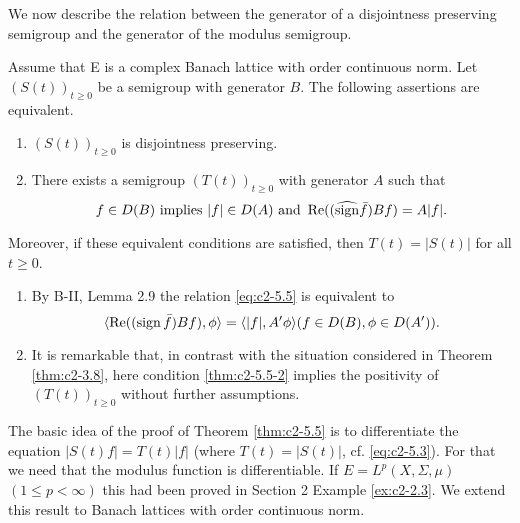 We now describe the relation between the generator of a disjointness preserving semigroup and the generator of the modulus semigroup.

\begin{theorem}\label{thm:c2-5.5}
Assume that E is a complex Banach lattice with order continuous norm. 
Let $(S(t))_{t \geq 0}$ be a semigroup with generator $B$.
The following assertions are equivalent.
\begin{enumerate}[\upshape (a)]
\item \label{thm:c2-5.5-1}
$(S(t))_{t \geq 0}$ is disjointness preserving.
\item \label{thm:c2-5.5-2}
There exists a semigroup $(T(t))_{t \geq 0}$ with generator $A$ such
that
\begin{equation}\label{eq:c2-5.5}
f \in D(B) \text{ implies } |f| \in D(A) \text{ and } \mathop{}\!\mathrm{Re}((\widehat{\operatorname{sign}}  \bar{f})Bf) = A|f|.
\end{equation}
\end{enumerate}
Moreover, if these equivalent conditions are satisfied, then
$T(t) = |S(t)|$ for all $t \geq 0$.
\end{theorem}

\begin{remark*} 
\begin{enumerate}[\upshape (i), wide, labelindent=.5em] %
\item  \label{enum:c2-kgk.1-1} %
By B-II, Lemma 2.9 
the relation \eqref{eq:c2-5.5} is equivalent to
\[
\langle\mathop{}\!\mathrm{Re}((\operatorname{sign}  \bar{f})Bf),\phi \rangle = \langle|f|,A'\phi\rangle  (f \in D(B), \phi \in D(A')).
\]
\item \label{enum:c2-kgk.1-2}
It is remarkable that, in contrast with the situation considered in
Theorem \ref{thm:c2-3.8}, here condition \ref{thm:c2-5.5-2}  implies the positivity of $(T(t))_{t \geq 0}$
without further assumptions.
\end{enumerate}
\end{remark*}

The basic idea of the proof of Theorem \ref{thm:c2-5.5}   is to differentiate the equation $|S(t)f| = T(t)|f|$ (where $T(t) = |S(t)|$, cf. \eqref{eq:c2-5.3}). For
that we need that the modulus function is differentiable.
If $E = L^{p}(X,\Sigma,\mu)$ $(1 \leq p < \infty)$ this had been proved in Section 2 Example 
\ref{ex:c2-2.3}.
We extend this result to Banach lattices with order continuous norm.

